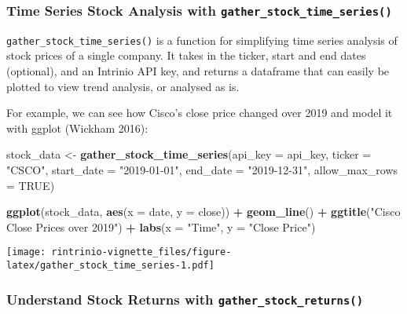 \documentclass[
]{article}
\newenvironment{Shaded}{\begin{snugshade}}{\end{snugshade}}
\newcommand{\DataTypeTok}[1]{\textcolor[rgb]{0.13,0.29,0.53}{#1}}
\newcommand{\KeywordTok}[1]{\textcolor[rgb]{0.13,0.29,0.53}{\textbf{#1}}}
\newcommand{\NormalTok}[1]{#1}
\newcommand{\OperatorTok}[1]{\textcolor[rgb]{0.81,0.36,0.00}{\textbf{#1}}}
\newcommand{\OtherTok}[1]{\textcolor[rgb]{0.56,0.35,0.01}{#1}}
\newcommand{\StringTok}[1]{\textcolor[rgb]{0.31,0.60,0.02}{#1}}
\begin{document}
\hypertarget{time-series-stock-analysis-with-gather_stock_time_series}{%
\subsubsection{\texorpdfstring{Time Series Stock Analysis with
\texttt{gather\_stock\_time\_series()}}{Time Series Stock Analysis with gather\_stock\_time\_series()}}\label{time-series-stock-analysis-with-gather_stock_time_series}}

\texttt{gather\_stock\_time\_series()} is a function for simplifying
time series analysis of stock prices of a single company. It takes in
the ticker, start and end dates (optional), and an Intrinio API key, and
returns a dataframe that can easily be plotted to view trend analysis,
or analysed as is.

For example, we can see how Cisco's close price changed over 2019 and
model it with ggplot (Wickham 2016):

\begin{Shaded}
\begin{Highlighting}[]
\NormalTok{stock\_data \textless{}{-}}\StringTok{ }\KeywordTok{gather\_stock\_time\_series}\NormalTok{(}\DataTypeTok{api\_key =}\NormalTok{ api\_key, }
                                       \DataTypeTok{ticker =} \StringTok{"CSCO"}\NormalTok{, }
                                       \DataTypeTok{start\_date =} \StringTok{"2019{-}01{-}01"}\NormalTok{, }
                                       \DataTypeTok{end\_date =} \StringTok{"2019{-}12{-}31"}\NormalTok{,}
                                       \DataTypeTok{allow\_max\_rows =} \OtherTok{TRUE}\NormalTok{)}

\KeywordTok{ggplot}\NormalTok{(stock\_data, }\KeywordTok{aes}\NormalTok{(}\DataTypeTok{x =}\NormalTok{ date, }\DataTypeTok{y =}\NormalTok{ close)) }\OperatorTok{+}
\StringTok{  }\KeywordTok{geom\_line}\NormalTok{() }\OperatorTok{+}
\StringTok{  }\KeywordTok{ggtitle}\NormalTok{(}\StringTok{"Cisco Close Prices over 2019"}\NormalTok{) }\OperatorTok{+}
\StringTok{  }\KeywordTok{labs}\NormalTok{(}\DataTypeTok{x =} \StringTok{"Time"}\NormalTok{, }\DataTypeTok{y =} \StringTok{"Close Price"}\NormalTok{)}
\end{Highlighting}
\end{Shaded}

\texttt{[image: rintrinio-vignette\_files/figure-latex/gather\_stock\_time\_series-1.pdf]}

\hypertarget{understand-stock-returns-with-gather_stock_returns}{%
\subsubsection{\texorpdfstring{Understand Stock Returns with
\texttt{gather\_stock\_returns()}}{Understand Stock Returns with gather\_stock\_returns()}}\label{understand-stock-returns-with-gather_stock_returns}}
\end{document}

